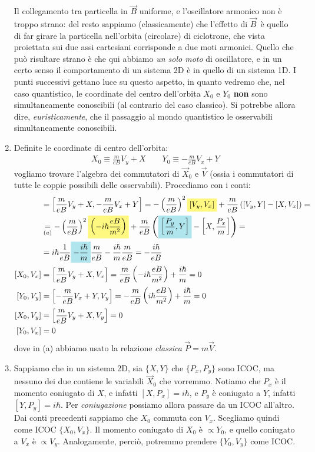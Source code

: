\documentclass[../../FisicaTeorica.tex]{subfiles}
\begin{document}
\begin{enumerate}
Il collegamento tra particella in $\vec{B}$ uniforme, e l'oscillatore armonico non è troppo strano: del resto sappiamo (classicamente) che l'effetto di $\vec{B}$\ è quello di far girare la particella nell'orbita (circolare) di ciclotrone, che vista proiettata sui due assi cartesiani corrisponde a due moti armonici. Quello che può risultare strano è che qui abbiamo \textit{un solo moto} di oscillatore, e in un certo senso il comportamento di un sistema 2D è  in quello di un sistema 1D. I punti successivi gettano luce su questo aspetto, in quanto vedremo che, nel caso quantistico, le coordinate del centro dell'orbita $X_0$ e $Y_0$ \textbf{non} sono simultaneamente conoscibili (al contrario del caso classico). Si potrebbe allora dire, \textit{euristicamente}, che il passaggio al mondo quantistico  le osservabili simultaneamente conoscibili.
\item Definite le coordinate di centro dell'orbita:
\begin{align*}
X_0 \equiv \frac{m}{eB}V_y + X\qquad Y_0 \equiv -\frac{m}{eB}V_x + Y
\end{align*}
vogliamo trovare l'algebra dei commutatori di $\vec{X}_0$ e $\vec{V}$ (ossia i commutatori di tutte le coppie possibili delle osservabili). Procediamo con i conti:
\begin{align*}
[X_0, Y_0] &= \left[\frac{m}{eB}V_y + X, -\frac{m}{eB}V_x + Y\right] = -\left(\frac{m}{eB}\right)^2 \hlc{Yellow}{[V_y, V_x]} + \frac{m}{eB}\left([V_y, Y] -[X,V_x]\right)=\\
&\underset{(a)}{=}-\left(\frac{m}{eB}\right)^2 \hlc{Yellow}{\left(-i\hbar \frac{eB}{m^2}\right) }+ \frac{m}{eB}\left(\hlc{SkyBlue}{\left[\frac{P_y}{m},Y\right]}-\left[X, \frac{P_x}{m}\right]\right)=\\
&= i\hbar \frac{1}{eB} \hlc{SkyBlue}{- \frac{i\hbar}{m}}\frac{m}{eB} - \frac{i\hbar}{m}\frac{m}{eB} = -\frac{i\hbar}{eB} \\
[X_0, V_x] &= \left[\frac{m}{eB}V_y + X, V_x \right] = \frac{m}{eB}\left(-i\hbar \frac{eB}{m^2}\right) + \frac{i\hbar}{m} = 0\\
[Y_0, V_y] &= \left[-\frac{m}{eB}V_x +Y, V_y\right] = -\frac{m}{eB}\left(i\hbar \frac{eB}{m^2} \right) + \frac{i\hbar}{m} = 0\\
[X_0, V_y] &= \left[\frac{m}{eB}V_y + X, V_y \right] = 0\\
[Y_0, V_x] &= 0 
\end{align*}
dove in (a) abbiamo usato la relazione \textit{classica} $\vec{P}=m\vec{V}$.
\item Sappiamo che in un sistema 2D, sia $\{X, Y\}$ che $\{P_x, P_y\}$ sono ICOC, ma nessuno dei due contiene le variabili $\vec{X}_0$ che vorremmo. Notiamo che $P_x$ è il momento coniugato di $X$, e infatti $[X,P_x]=i\hbar$, e $P_y$ è coniugato a $Y$, infatti $[Y,P_y] = i\hbar$. Per \textit{coniugazione} possiamo allora passare da un ICOC all'altro.\\
Dai conti precedenti sappiamo che $X_0$ commuta con $V_x$. Scegliamo quindi come ICOC $\{X_0, V_x\}$. Il momento coniugato di $X_0$ è $\propto Y_0$, e quello coniugato a $V_x$ è $\propto V_y$. Analogamente, perciò, potremmo prendere $\{Y_0, V_y\}$ come ICOC.\\


\end{enumerate}
\end{document}
